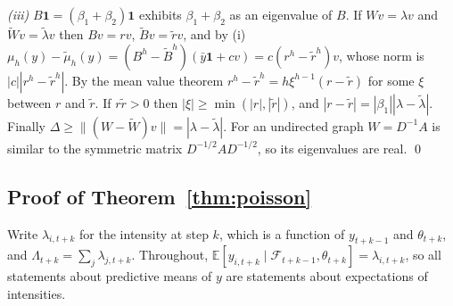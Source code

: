 \documentclass[12pt]{article}
\theoremstyle{plain}
\theoremstyle{definition}
\theoremstyle{remark}
\newcommand{\E}{\mathbb{E}}
\newcommand{\one}{\mathbf{1}}
\newcommand{\calF}{\mathcal{F}}
\begin{document}
\emph{(iii)} $B\one=(\beta_1+\beta_2)\one$ exhibits $\beta_1+\beta_2$ as an eigenvalue of $B$. If $Wv=\lambda v$ and $\widetilde Wv=\tilde\lambda v$ then $Bv=rv$, $\widetilde Bv=\tilde rv$, and by (i) $\mu_h(y)-\tilde\mu_h(y)=(B^h-\widetilde B^h)(\bar y\one+cv)=c(r^h-\tilde r^h)v$, whose norm is $|c||r^h-\tilde r^h|$. By the mean value theorem $r^h-\tilde r^h=h\xi^{h-1}(r-\tilde r)$ for some $\xi$ between $r$ and $\tilde r$. If $r\tilde r>0$ then $|\xi|\ge\min(|r|,|\tilde r|)$, and $|r-\tilde r|=|\beta_1||\lambda-\tilde\lambda|$. Finally $\Delta\ge\|(W-\widetilde W)v\|=|\lambda-\tilde\lambda|$. For an undirected graph $W=D^{-1}A$ is similar to the symmetric matrix $D^{-1/2}AD^{-1/2}$, so its eigenvalues are real. \qed

\subsection{Proof of Theorem~\ref{thm:poisson}}

Write $\lambda_{i,t+k}$ for the intensity at step $k$, which is a function of $y_{t+k-1}$ and $\theta_{t+k}$, and $\Lambda_{t+k}=\sum_j\lambda_{j,t+k}$. Throughout, $\E[y_{i,t+k}\mid\calF_{t+k-1},\theta_{t+k}]=\lambda_{i,t+k}$, so all statements about predictive means of $y$ are statements about expectations of intensities.
\end{document}
